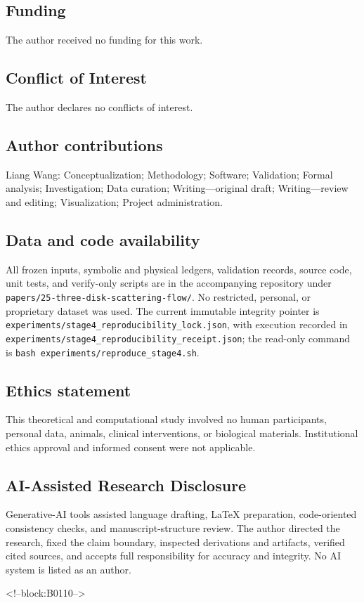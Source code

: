 \documentclass[11pt,a4paper]{article}
\theoremstyle{definition}
\theoremstyle{remark}
\begin{document}
\subsection*{Funding}
The author received no funding for this work.
\subsection*{Conflict of Interest}
The author declares no conflicts of interest.
\subsection*{Author contributions}
Liang Wang: Conceptualization; Methodology; Software; Validation; Formal analysis; Investigation; Data curation; Writing---original draft; Writing---review and editing; Visualization; Project administration.
\subsection*{Data and code availability}
All frozen inputs, symbolic and physical ledgers, validation records, source code, unit tests, and verify-only scripts are in the accompanying repository under \texttt{papers/25-three-disk-scattering-flow/}. No restricted, personal, or proprietary dataset was used. The current immutable integrity pointer is \texttt{experiments/stage4\_reproducibility\_lock.json}, with execution recorded in \texttt{experiments/stage4\_reproducibility\_receipt.json}; the read-only command is \texttt{bash experiments/reproduce\_stage4.sh}.
\subsection*{Ethics statement}
This theoretical and computational study involved no human participants, personal data, animals, clinical interventions, or biological materials. Institutional ethics approval and informed consent were not applicable.
\subsection*{AI-Assisted Research Disclosure}
Generative-AI tools assisted language drafting, LaTeX preparation, code-oriented consistency checks, and manuscript-structure review. The author directed the research, fixed the claim boundary, inspected derivations and artifacts, verified cited sources, and accepts full responsibility for accuracy and integrity. No AI system is listed as an author.

<!--block:B0110-->


\end{document}

